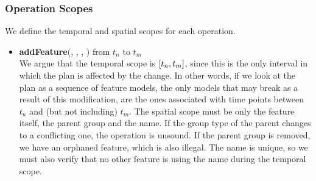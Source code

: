 \subsubsection*{Operation Scopes}
We define the temporal and spatial scopes for each operation.
\begin{itemize}

  \item \textbf{addFeature}(, , , ) from $t_n$ to $t_m$\\
     We argue that the temporal scope is $\interval{t_n}{t_m}$, since this is the only interval in which the plan is affected by the change. In other words, if we look at the plan as a sequence of feature models, the only models that may break as a result of this modification, are the ones associated with time points between $t_n$ and (but not including) $t_m$. The spatial scope must be only the feature itself, the parent group and the name. If the group type of the parent changes to a conflicting one, the operation is unsound. If the parent group is removed, we have an orphaned feature, which is also illegal. The name is unique, so we must also verify that no other feature is using the name during the temporal scope. 
 


\end{itemize}
